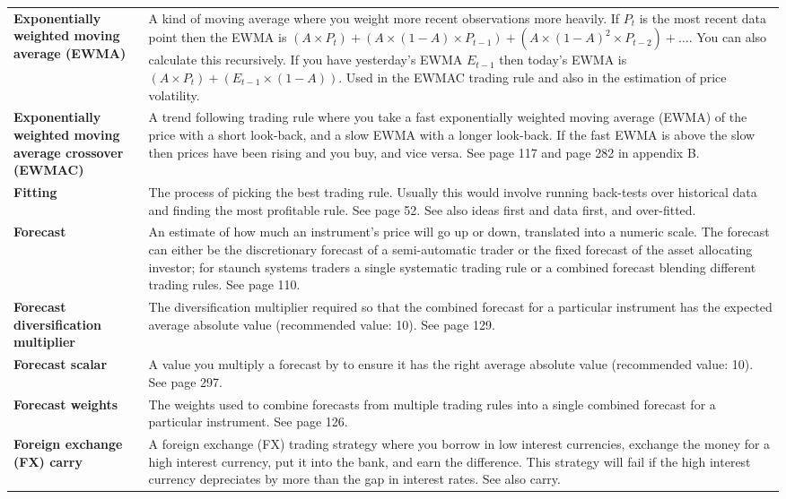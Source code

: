 {\begin{longtable}{@{}>{\raggedright\arraybackslash\bfseries} p{}>{\raggedright\arraybackslash} p{}@{}}
Exponentially weighted moving average (EWMA) & A kind of moving average where you weight more recent observations more heavily. If \(P_t\) is the most recent data point then the EWMA is \((A \times P_t) + (A \times (1 - A) \times P_{t-1}) + (A \times (1 - A)^2 \times P_{t-2}) + \dots\). You can also calculate this recursively. If you have yesterday’s EWMA \(E_{t-1}\) then today’s EWMA is \((A \times P_t) + (E_{t-1} \times (1 - A))\). Used in the EWMAC trading rule and also in the estimation of price volatility. \\[0.65em]
Exponentially weighted moving average crossover (EWMAC) & A trend following trading rule where you take a fast exponentially weighted moving average (EWMA) of the price with a short look-back, and a slow EWMA with a longer look-back. If the fast EWMA is above the slow then prices have been rising and you buy, and vice versa. See page 117 and page 282 in appendix B. \\[0.65em]
Fitting & The process of picking the best trading rule. Usually this would involve running back-tests over historical data and finding the most profitable rule. See page 52. See also ideas first and data first, and over-fitted. \\[0.65em]
Forecast & An estimate of how much an instrument’s price will go up or down, translated into a numeric scale. The forecast can either be the discretionary forecast of a semi-automatic trader or the fixed forecast of the asset allocating investor; for staunch systems traders a single systematic trading rule or a combined forecast blending different trading rules. See page 110. \\[0.65em]
Forecast diversification multiplier & The diversification multiplier required so that the combined forecast for a particular instrument has the expected average absolute value (recommended value: 10). See page 129. \\[0.65em]
Forecast scalar & A value you multiply a forecast by to ensure it has the right average absolute value (recommended value: 10). See page 297. \\[0.65em]
Forecast weights & The weights used to combine forecasts from multiple trading rules into a single combined forecast for a particular instrument. See page 126. \\[0.65em]
Foreign exchange (FX) carry & A foreign exchange (FX) trading strategy where you borrow in low interest currencies, exchange the money for a high interest currency, put it into the bank, and earn the difference. This strategy will fail if the high interest currency depreciates by more than the gap in interest rates. See also carry. \\[0.65em]

\end{longtable}}

